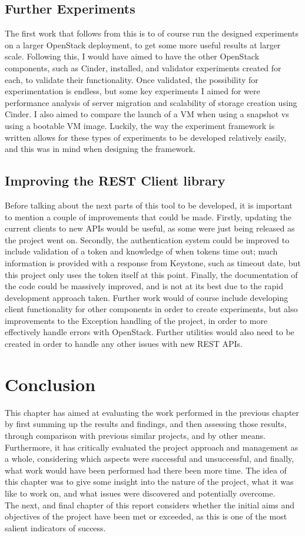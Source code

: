 \subsection{Further Experiments}
The first work that follows from this is to of course run the designed experiments on a larger OpenStack deployment, to get some more useful results at larger scale. Following this, I would have aimed to have the other OpenStack components, such as Cinder, installed, and validator experiments created for each, to validate their functionality. Once validated, the possibility for experimentation is endless, but some key experiments I aimed for were performance analysis of server migration and scalability of storage creation using Cinder. I also aimed to compare the launch of a VM when using a snapshot vs using a bootable VM image. Luckily, the way the experiment framework is written allows for these types of experiments to be developed relatively easily, and this was in mind when designing the framework. 

\subsection{Improving the REST Client library}
Before talking about the next parts of this tool to be developed, it is important to mention a couple of improvements that could be made. Firstly, updating the current clients to new APIs would be useful, as some were just being released as the project went on. Secondly, the authentication system could be improved to include validation of a token and knowledge of when tokens time out; much information is provided with a response from Keystone, such as timeout date, but this project only uses the token itself at this point. Finally, the documentation of the code could be massively improved, and is not at its best due to the rapid development approach taken. Further work would of course include developing client functionality for other components in order to create experiments, but also improvements to the Exception handling of the project, in order to more effectively handle errors with OpenStack. Further utilities would also need to be created in order to handle any other issues with new REST APIs. 

\section{Conclusion}

This chapter has aimed at evaluating the work performed in the previous chapter by first summing up the results and findings, and then assessing those results, through comparison with previous similar projects, and by other means.  Furthermore, it has critically evaluated the project approach and management as a whole, considering which aspects were successful and unsuccessful, and finally, what work would have been performed had there been more time. The idea of this chapter was to give some insight into the nature of the project, what it was like to work on, and what issues were discovered and potentially overcome. \\

The next, and final chapter of this report considers whether the initial aims and objectives of the project have been met or exceeded, as this is one of the most salient indicators of success.    